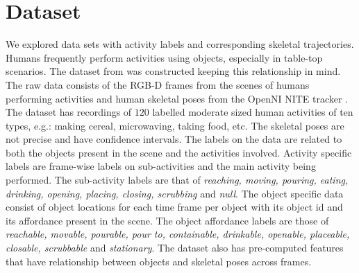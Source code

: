\documentclass{article} %
\begin{document}
\section{Dataset}
We explored data sets with activity labels and corresponding skeletal trajectories. Humans frequently perform activities using objects, especially in table-top scenarios. The dataset from \cite{koppula2013detectingactivitiesrgbd} was constructed keeping this relationship in mind. The raw data consists of the RGB-D frames from the scenes of humans performing activities and human skeletal poses from the OpenNI NITE tracker \cite{PrimeSense2010}. The dataset has recordings of  $120$ labelled moderate sized human activities of ten types, e.g.: making cereal, microwaving, taking food, etc. The skeletal poses are not precise and have confidence intervals. The labels on the data are related to both the objects present in the scene and the activities involved. Activity specific labels are frame-wise labels on sub-activities and the main activity being performed. The sub-activity labels are that of \textit{reaching, moving, pouring, eating, drinking, opening, placing, closing, scrubbing} and \textit{null}. The object specific data consist of object locations for each time frame per object with its object id and its affordance present in the scene. The object affordance labels are those of \textit{reachable, movable, pourable, pour to, containable, drinkable, openable, placeable, closable, scrubbable} and \textit{stationary}. The dataset also has pre-computed features that have relationship between objects and skeletal poses across frames.  
\end{document}
